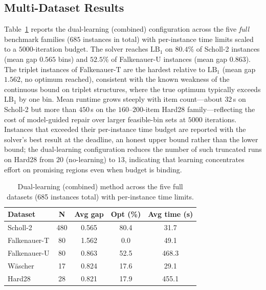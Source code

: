 \documentclass[conference]{IEEEtran}
\begin{document}
\subsection{Multi-Dataset Results}
Table~\ref{tab:multi} reports the dual-learning (combined) configuration across
the five \emph{full} benchmark families ($685$ instances in total) with
per-instance time limits scaled to a $5000$-iteration budget. The solver
reaches $\mathrm{LB}_1$ on $80.4\%$ of Scholl-2 instances (mean gap $0.565$
bins) and $52.5\%$ of Falkenauer-U instances (mean gap $0.863$). The triplet
instances of Falkenauer-T are the hardest relative to $\mathrm{LB}_1$ (mean
gap $1.562$, no optimum reached), consistent with the known weakness of the
continuous bound on triplet structures, where the true optimum typically
exceeds $\mathrm{LB}_1$ by one bin. Mean runtime grows steeply with item
count---about $32$\,s on Scholl-2 but more than $450$\,s on the $160$--$200$-item
Hard28 family---reflecting the cost of model-guided repair over larger
feasible-bin sets at $5000$ iterations. Instances that exceeded their
per-instance time budget are reported with the solver's best result at the
deadline, an honest upper bound rather than the lower bound; the dual-learning
configuration reduces the number of such truncated runs on Hard28 from $20$
(no-learning) to $13$, indicating that learning concentrates effort on
promising regions even when budget is binding.

\begin{table}[htbp]
	\caption{Dual-learning (combined) method across the five full datasets
		(685 instances total) with per-instance time limits.}
	\label{tab:multi}
	\centering
	\begin{tabular}{l c c c c}
		\hline
		\textbf{Dataset} & \textbf{N} & \textbf{Avg gap} & \textbf{Opt (\%)} & \textbf{Avg time (s)} \\
		\hline
		Scholl-2         & 480        & 0.565            & 80.4              & 31.7                  \\
		Falkenauer-T     & 80         & 1.562            & 0.0               & 49.1                  \\
		Falkenauer-U     & 80         & 0.863            & 52.5              & 468.3                 \\
		W\"ascher        & 17         & 0.824            & 17.6              & 29.1                  \\
		Hard28           & 28         & 0.821            & 17.9              & 455.1                 \\
		\hline
	\end{tabular}
\end{table}
\end{document}
